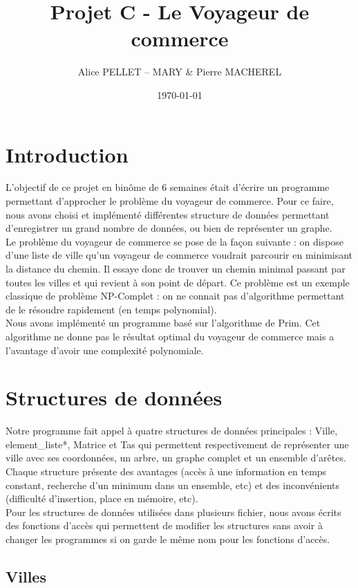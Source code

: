 \documentclass[a4paper,11pt]{article}
\date{\today}
\title{Projet C - Le Voyageur de commerce}
\author{Alice PELLET -- MARY \& Pierre MACHEREL}
\begin{document}
\maketitle
\tableofcontents

\section*{Introduction} %

L'objectif de ce projet en binôme de 6 semaines était d'écrire un programme permettant d'approcher le problème du voyageur de commerce. Pour ce faire, nous avons choisi et implémenté différentes structure de données permettant d'enregistrer un grand nombre de données, ou bien de représenter un graphe.\\
Le problème du voyageur de commerce se pose de la façon suivante : on dispose d'une liste de ville qu'un voyageur de commerce voudrait parcourir en minimisant la distance du chemin. Il essaye donc de trouver un chemin minimal passant par toutes les villes et qui revient à son point de départ. Ce problème est un exemple classique de problème NP-Complet : on ne connait pas d'algorithme permettant de le résoudre rapidement (en temps polynomial).\\
Nous avons implémenté un programme basé sur l'algorithme de Prim. Cet algorithme ne donne pas le résultat optimal du voyageur de commerce mais a l'avantage d'avoir une complexité polynomiale.

\section{Structures de données}
Notre programme fait appel à quatre structures de données principales : \textsf{Ville}, \textsf{element\_liste*}, \textsf{Matrice} et \textsf{Tas} qui permettent respectivement de représenter une ville avec ses coordonnées, un arbre, un graphe complet et un ensemble d'arêtes.
Chaque structure présente des avantages (accès à une information en temps constant, recherche d'un minimum dans un ensemble, etc) et des inconvénients (difficulté d'insertion, place en mémoire, etc).\\
Pour les structures de données utilisées dans plusieurs fichier, nous avons écrits des fonctions d'accès qui permettent de modifier les structures sans avoir à changer les programmes si on garde le même nom pour les fonctions d'accès.

\subsection{Villes}
\end{document}
